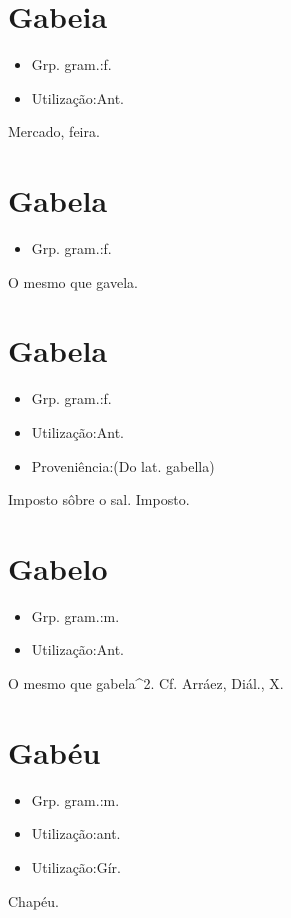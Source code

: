 \section{Gabeia}
\begin{itemize}
\item {Grp. gram.:f.}
\end{itemize}
\begin{itemize}
\item {Utilização:Ant.}
\end{itemize}
Mercado, feira.
\section{Gabela}
\begin{itemize}
\item {Grp. gram.:f.}
\end{itemize}
O mesmo que \textunderscore gavela\textunderscore .
\section{Gabela}
\begin{itemize}
\item {Grp. gram.:f.}
\end{itemize}
\begin{itemize}
\item {Utilização:Ant.}
\end{itemize}
\begin{itemize}
\item {Proveniência:(Do lat. \textunderscore gabella\textunderscore )}
\end{itemize}
Imposto sôbre o sal.
Imposto.
\section{Gabelo}
\begin{itemize}
\item {Grp. gram.:m.}
\end{itemize}
\begin{itemize}
\item {Utilização:Ant.}
\end{itemize}
O mesmo que \textunderscore gabela\textunderscore ^2. Cf. Arráez, \textunderscore Diál.\textunderscore , X.
\section{Gabéu}
\begin{itemize}
\item {Grp. gram.:m.}
\end{itemize}
\begin{itemize}
\item {Utilização:ant.}
\end{itemize}
\begin{itemize}
\item {Utilização:Gír.}
\end{itemize}
Chapéu.
